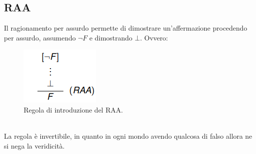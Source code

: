 \documentclass[12pt]{article}
\begin{document}
\subsection{RAA}
\label{sec:RAA}
Il ragionamento per assurdo permette di dimostrare un'affermazione procedendo per assurdo, assumendo $\neg F$ e dimostrando $\bot$. Ovvero:
\begin{figure}[!htb]
    \centering
    \includegraphics[width=.9\linewidth,height=.2\textheight,keepaspectratio]{logica_proposizionale/introduzione/RAA.png} %
    \begin{center}
        \caption{\label{fig:RAA}Regola di introduzione del RAA.} %
    \end{center}
\end{figure}
\\
La regola è invertibile, in quanto in ogni mondo avendo qualcosa di falso allora ne si nega la veridicità.
\end{document}
